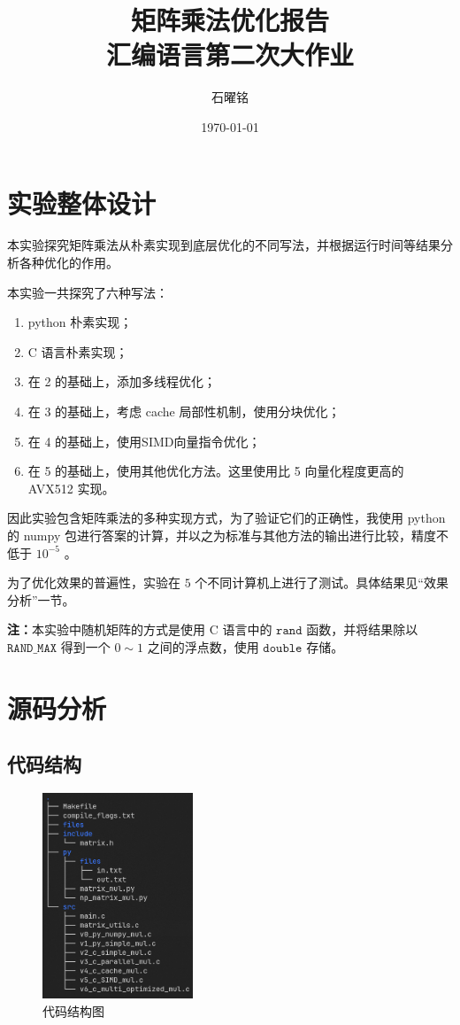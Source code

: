 \documentclass{article}
\title{矩阵乘法优化报告\\ \large 汇编语言第二次大作业}
\author{石曜铭}
\date{\today}
\begin{document}
\maketitle


\section{实验整体设计}

本实验探究矩阵乘法从朴素实现到底层优化的不同写法，并根据运行时间等结果分析各种优化的作用。

本实验一共探究了六种写法：
\begin{enumerate}
\item python 朴素实现；
\item C 语言朴素实现；
\item 在 2 的基础上，添加多线程优化；
\item 在 3 的基础上，考虑 cache 局部性机制，使用分块优化；
\item 在 4 的基础上，使用SIMD向量指令优化；
\item 在 5 的基础上，使用其他优化方法。这里使用比 5 向量化程度更高的 AVX512 实现。
\end{enumerate}

因此实验包含矩阵乘法的多种实现方式，为了验证它们的正确性，我使用 python 的 numpy 包进行答案的计算，并以之为标准与其他方法的输出进行比较，精度不低于 $10^{-5}$ 。

为了优化效果的普遍性，实验在 $5$ 个不同计算机上进行了测试。具体结果见“效果分析”一节。

\textbf{注：}本实验中随机矩阵的方式是使用 C 语言中的 $\texttt{rand}$ 函数，并将结果除以 $\texttt{RAND\_MAX}$ 得到一个 $0\sim 1$ 之间的浮点数，使用 $\texttt{double}$ 存储。

\section{源码分析}

\subsection{代码结构}

\begin{figure}
  \includegraphics[width=0.4\textwidth]{pics/structure.png}
  \caption*{代码结构图}
\end{figure}
\end{document}
